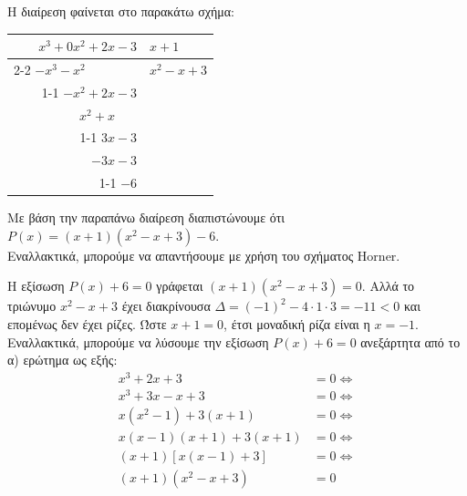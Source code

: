 \begin{alist}
\item Η διαίρεση φαίνεται στο παρακάτω σχήμα:
\begin{center}
\begin{tabular}{r|l}
$x^3 + 0x^2 + 2x - 3$ & $x + 1$ \\ \cline{2-2}
$-x^3 - x^2 \phantom{{} + 2x - 3}$ & $x^2 - x + 3$ \\ \cline{1-1}
$-x^2 + 2x - 3$ & \\
$x^2 + x \phantom{{} - 3}$ & \\ \cline{1-1}
$3x - 3$ & \\
$-3x - 3$ & \\ \cline{1-1}
$-6$ &
\end{tabular}
\end{center}
Με βάση την παραπάνω διαίρεση διαπιστώνουμε ότι $P(x) = (x+1)(x^2-x+3) - 6$. \\
Εναλλακτικά, μπορούμε να απαντήσουμε με χρήση του σχήματος Horner.
\item Η εξίσωση $P(x) + 6 = 0$ γράφεται $(x+1)(x^2-x+3) = 0$. Αλλά το τριώνυμο $x^2-x+3$ έχει διακρίνουσα $\Delta = (-1)^2 - 4 \cdot 1 \cdot 3 = -11 < 0$ και επομένως δεν έχει ρίζες. Ώστε $x+1=0$, έτσι μοναδική ρίζα είναι η $x=-1$.
Εναλλακτικά, μπορούμε να λύσουμε την εξίσωση $P(x)+6=0$ ανεξάρτητα από το α) ερώτημα ως εξής:
\begin{align*}
x^3 + 2x + 3 &= 0 \Leftrightarrow \\
x^3 + 3x - x + 3 &= 0 \Leftrightarrow \\
x(x^2 - 1) + 3(x + 1) &= 0 \Leftrightarrow \\
x(x - 1)(x + 1) + 3(x + 1) &= 0 \Leftrightarrow \\
(x + 1)[x(x - 1) + 3] &= 0 \Leftrightarrow \\
(x + 1)(x^2 - x + 3) &= 0
\end{align*}
\end{alist}

